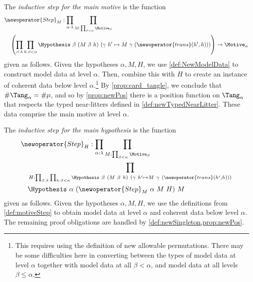 \begin{definition}
  \label{def:motiveStep}
  The \emph{inductive step for the main motive} is the function
  \begin{align*}
    &\newoperator{Step}_M : \prod_{\alpha : \lambda} \prod_{M : \prod_{\beta < \alpha} \Motive_\beta} \\
    &\quad\left( \prod_{\beta : \lambda} \prod_{h : \beta < \alpha} \Hypothesis\ \beta\ (M\ \beta\ h)\ (\gamma\ h' \mapsto M\ \gamma\ (\newoperator{trans}(h',h))) \right) \to \Motive_\alpha
  \end{align*}
  given as follows.
  Given the hypotheses \( \alpha, M, H \), we use \cref{def:NewModelData} to construct model data at level \( \alpha \).
  Then, combine this with \( H \) to create an instance of coherent data below level \( \alpha \).\footnote{This requires using the definition of new allowable permutations. There may be some difficulties here in converting between the types of model data at level \( \alpha \) together with model data at all \( \beta < \alpha \), and model data at all levels \( \beta \leq \alpha \).}
  By \cref{prop:card_tangle}, we conclude that \( \#\Tang_\alpha = \#\mu \), and so by \cref{prop:newPos} there is a position function on \( \Tang_\alpha \) that respects the typed near-litters defined in \cref{def:newTypedNearLitter}.
  These data comprise the main motive at level \( \alpha \).
\end{definition}
\begin{definition}
  \label{def:hypothesisStep}
  The \emph{inductive step for the main hypothesis} is the function
  \begin{align*}
    &\newoperator{Step}_H : \prod_{\alpha : \lambda} \prod_{M : \prod_{\beta < \alpha} \Motive_\beta} \\
    &\quad\prod_{H : \prod_{\beta : \lambda} \prod_{h : \beta < \alpha} \Hypothesis\ \beta\ (M\ \beta\ h)\ (\gamma\ h' \mapsto M\ \gamma\ (\newoperator{trans}(h',h)))}\\
    &\quad\Hypothesis\ \alpha\ (\newoperator{Step}_M\ \alpha\ M\ H)\ M
  \end{align*}
  given as follows.
  Given the hypotheses \( \alpha, M, H \), we use the definitions from \cref{def:motiveStep} to obtain model data at level \( \alpha \) and coherent data below level \( \alpha \).
  The remaining proof obligations are handled by \cref{def:newSingleton,prop:newPos}.
\end{definition}
